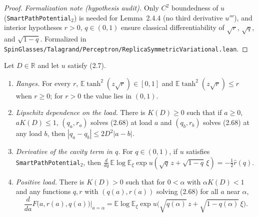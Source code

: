 \begin{proof}
\emph{Formalization note (hypothesis audit).} Only $C^2$ boundedness of $u$ (\texttt{SmartPathPotential}$_2$)
is needed for Lemma~2.4.4 (no third derivative $u'''$), and interior hypotheses $r>0$, $q\in(0,1)$
ensure classical differentiability of $\sqrt r$, $\sqrt q$, and $\sqrt{1-q}$.
Formalized in \texttt{SpinGlasses/Talagrand/Perceptron/ReplicaSymmetricVariational.lean}.
\end{proof}

\begin{proposition}\label{prop:sg-tal:perceptron-rs-envelope}
  \leanok
Let $D\in\mathbb R$ and let $u$ satisfy (2.7).
\begin{enumerate}
\item \emph{Ranges.} For every $r$, $\mathbb E\tanh^2(z\sqrt r)\in[0,1]$ and $\mathbb E\tanh^2(z\sqrt r)\le r$ when $r\ge0$; for $r>0$ the value lies in $(0,1)$.
\item \emph{Lipschitz dependence on the load.} There is $K(D)\ge0$ such that if $a\ge0$,
$aK(D)\le1$, $(q_a,r_a)$ solves (2.68) at load $a$ and $(q_b,r_b)$ solves (2.68) at any load $b$, then
$|q_a-q_b|\le 2D^2|a-b|$.
\item \emph{Derivative of the cavity term in $q$.} For $q\in(0,1)$, if $u$ satisfies
\texttt{SmartPathPotential}$_2$, then
$\frac{d}{dq}\,\mathbb E\log\mathbb E_\xi\exp u(\sqrt q\,z+\sqrt{1-q}\,\xi)=-\frac12\widehat r(q)$.
\item \emph{Positive load.} There is $K(D)>0$ such that for $0<\alpha$ with $\alpha K(D)<1$ and
any functions $q,r$ with $(q(a),r(a))$ solving (2.68) for all $a$ near $\alpha$,
\[
 \frac{d}{da}F\bigl(a,r(a),q(a)\bigr)\Big|_{a=\alpha}
 =\mathbb E\log\mathbb E_\xi\exp u\bigl(\sqrt{q(\alpha)}\,z+\sqrt{1-q(\alpha)}\,\xi\bigr).
\]

\end{enumerate}
\end{proposition}
